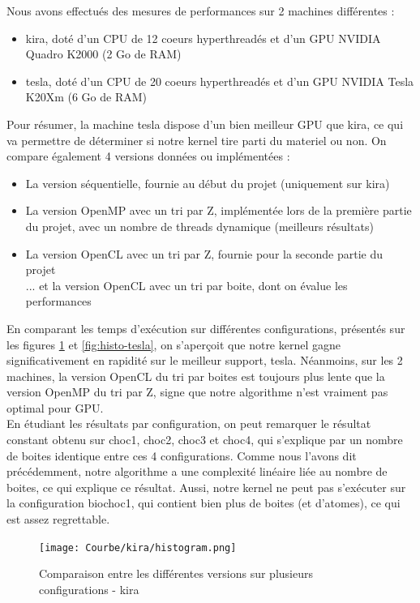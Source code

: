 \documentclass[]{article}
\begin{document}
Nous avons effectués des mesures de performances sur 2 machines différentes : 
\begin{itemize}
\item kira, doté d'un CPU de 12 coeurs hyperthreadés et d'un GPU NVIDIA Quadro K2000 (2 Go de RAM)
\item tesla, doté d'un CPU de 20 coeurs hyperthreadés et d'un GPU NVIDIA Tesla K20Xm (6 Go de RAM) \\
\end{itemize}
Pour résumer, la machine tesla dispose d'un bien meilleur GPU que kira, ce qui va permettre de déterminer si notre kernel tire parti du materiel ou non. 
On compare également 4 versions données ou implémentées :
\begin{itemize}
\item La version séquentielle, fournie au début du projet (uniquement sur kira)
\item La version OpenMP avec un tri par Z, implémentée lors de la première partie du projet, avec un nombre de threads dynamique (meilleurs résultats)
\item La version OpenCL avec un tri par Z, fournie pour la seconde partie du projet \\
... et la version OpenCL avec un tri par boite, dont on évalue les performances \\
\end{itemize}

En comparant les temps d'exécution sur différentes configurations, présentés sur les figures \ref{fig:histo-kira} et \ref{fig:histo-tesla}, on s'aperçoit que notre kernel gagne significativement en rapidité sur le meilleur support, tesla. Néanmoins, sur les 2 machines, la version OpenCL du tri par boites est toujours plus lente que la version OpenMP du tri par Z, signe que notre algorithme n'est vraiment pas optimal pour GPU.\\

En étudiant les résultats par configuration, on peut remarquer le résultat constant obtenu sur choc1, choc2, choc3 et choc4, qui s'explique par un nombre de boites identique entre ces 4 configurations. Comme nous l'avons dit précédemment, notre algorithme a une complexité linéaire liée au nombre de boites, ce qui explique ce résultat. Aussi, notre kernel ne peut pas s'exécuter sur la configuration biochoc1, qui contient bien plus de boites (et d'atomes), ce qui est assez regrettable.\\

\begin{figure}[H]
  \centering
  \texttt{[image: Courbe/kira/histogram.png]} 
  \caption{Comparaison entre les différentes versions sur plusieurs configurations - kira}
  \label{fig:histo-kira}
\end{figure}
\end{document}
